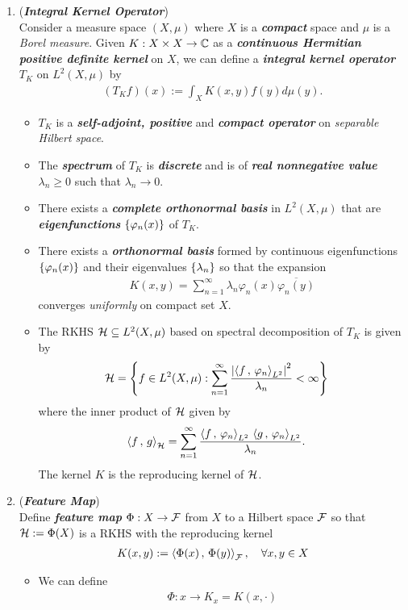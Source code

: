\documentclass[11pt]{article}
\begin{document}
\begin{enumerate}
\item (\emph{\textbf{Integral Kernel Operator}})\\
Consider a measure space $(X, \mu)$ where  $X$ is  a \emph{\textbf{compact}} space and $\mu$ is a \emph{Borel measure}. Given $K: X \times X \rightarrow {\mathbb C}$ as a \emph{\textbf{continuous Hermitian positive definite kernel}} on $X$, we can define a \emph{\textbf{integral kernel operator}} $T_K$ on $L^2(X, \mu)$ by
\begin{align*}
(T_{K}f)(x) := \int_{X} K(x, y)f(y) d\mu(y).
\end{align*}
\begin{itemize}
\item $T_K$ is a \emph{\textbf{self-adjoint, positive}} and \emph{\textbf{compact operator}} on \emph{separable Hilbert space}.
\item The \emph{\textbf{spectrum}} of $T_K$ is \emph{\textbf{discrete}} and is of \emph{\textbf{real nonnegative value $\lambda_n \ge 0$}} such that  $\lambda_n \rightarrow 0$.
\item There exists a \emph{\textbf{complete orthonormal basis}} in $L^2(X, \mu)$ that are \emph{\textbf{eigenfunctions}} $\left\{\varphi_n(x)\right\}$ of $T_K$.
\item There exists a \emph{\textbf{orthonormal basis}} formed by continuous eigenfunctions $\left\{\varphi_n(x)\right\}$ and their eigenvalues $\left\{\lambda_n\right\}$ so that the expansion  
\begin{align*}
K(x,y) = \sum_{n=1}^{\infty}\lambda_{n}\varphi_n(x)\overline{\varphi_n(y)}
\end{align*} converges \emph{uniformly} on compact set $X$. 
\item The RKHS ${\mathcal H} \subseteq L^2(X, \mu)$ based on spectral decomposition of $T_K$ is given by 
\begin{align*}
{\mathcal H} &= \left\{f \in L^2(X, \mu): \sum_{n=1}^{\infty}\frac{\left\lvert \left\langle f\,,\, \varphi_n \right\rangle_{L^2} \right\rvert^2}{\lambda_n} < \infty \right\}
\end{align*} where the inner product of ${\mathcal H}$ given by
\begin{align*}
\left\langle f\,,\, g \right\rangle_{{\mathcal H}} &= \sum_{n=1}^{\infty}\frac{\left\langle f\,,\, \varphi_n \right\rangle_{L^2}\, \left\langle g\,,\, \varphi_n \right\rangle_{L^2}}{\lambda_n}.
\end{align*} The kernel $K$ is the reproducing kernel of ${\mathcal H}$.
\end{itemize}


\item (\emph{\textbf{Feature Map}})\\
Define \emph{\textbf{feature map}} $\Phi: X \rightarrow {\mathcal F}$ from $X$ to a Hilbert space ${\mathcal F}$ so that ${\mathcal H} := \Phi(X)$ is a RKHS with the reproducing kernel
\begin{align*}
K(x, y) := \left\langle \Phi(x)\,,\, \Phi(y) \right\rangle_{{\mathcal F}}, \quad \forall x,y\in X
\end{align*} 
\begin{itemize}
\item We can define 
\begin{align*}
\Phi: x \rightarrow K_x = K(x, \cdot)
\end{align*}


\end{itemize}
\end{enumerate}
\end{document}
